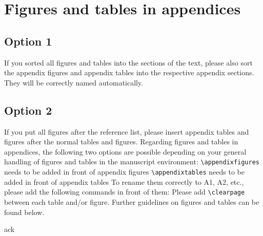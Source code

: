 \documentclass[gc, manuscript]{copernicus}
\begin{document}




\appendix
\section{Figures and tables in appendices}
\subsection{Option 1}

If you sorted all figures and tables into the sections of the text, please also sort the appendix figures and appendix tables into the respective appendix sections.
They will be correctly named automatically.

\subsection{Option 2}

If you put all figures after the reference list, please insert appendix tables and figures after the normal tables and figures.
Regarding figures and tables in appendices, the following two options are possible depending on your general handling of figures and tables in the manuscript environment:
\texttt{\textbackslash{}appendixfigures} needs to be added in front of appendix figures
\texttt{\textbackslash{}appendixtables} needs to be added in front of appendix tables
To rename them correctly to A1, A2, etc., please add the following commands in front of them:
Please add \texttt{\textbackslash{}clearpage} between each table and/or figure. Further guidelines on figures and tables can be found below.
\noappendix




\begin{acknowledgements}
ack
\end{acknowledgements}
\end{document}
